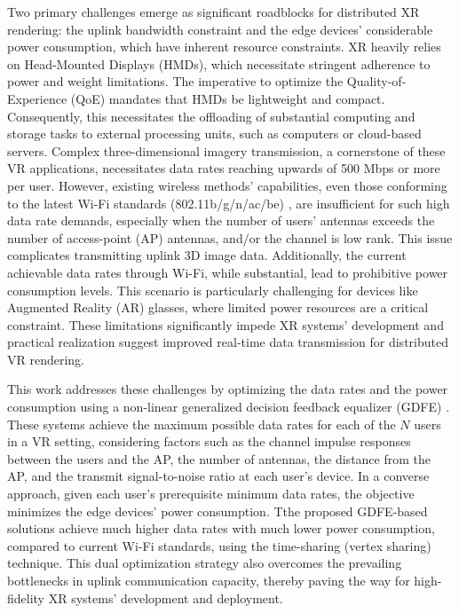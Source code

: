 Two primary challenges emerge as significant roadblocks for distributed XR rendering: the uplink bandwidth constraint and the edge devices' considerable power consumption, which have inherent resource constraints. XR heavily relies on Head-Mounted Displays (HMDs), which necessitate stringent adherence to power and weight limitations. The imperative to optimize the Quality-of-Experience (QoE) mandates that HMDs be lightweight and compact. Consequently, this necessitates the offloading of substantial computing and storage tasks to external processing units, such as computers or cloud-based servers.  Complex three-dimensional imagery transmission, a cornerstone of these VR applications, necessitates data rates reaching upwards of 500 Mbps or more per user. However, existing wireless methods' capabilities, even those conforming to the latest Wi-Fi standards (802.11b/g/n/ac/be) \cite{ieee80211ax2021}, are insufficient for such high data rate demands, especially when the number of users' antennas exceeds the number of access-point (AP) antennas, and/or the channel is low rank. This issue complicates transmitting uplink 3D image data. Additionally, the current achievable data rates through Wi-Fi, while substantial, lead to prohibitive power consumption levels. This scenario is particularly challenging for devices like Augmented Reality (AR) glasses, where limited power resources are a critical constraint. These limitations significantly impede XR systems' development and practical realization suggest improved real-time data transmission for distributed VR rendering.


This work addresses these challenges by optimizing the data rates and the power consumption using a non-linear generalized decision feedback equalizer (GDFE) \cite{book}. These systems achieve the maximum possible data rates for each of the \( N \) users in a VR setting, considering factors such as the channel impulse responses between the users and the AP, the number of antennas, the distance from the AP, and the transmit signal-to-noise ratio at each user's device. In a converse approach, given each user's prerequisite minimum data rates, the objective minimizes the edge devices' power consumption. Tthe proposed GDFE-based solutions achieve much higher data rates with much lower power consumption, compared to current Wi-Fi standards, using the time-sharing (vertex sharing) technique. This dual optimization strategy also overcomes the prevailing bottlenecks in uplink communication capacity, thereby paving the way for high-fidelity XR systems' development and deployment.

